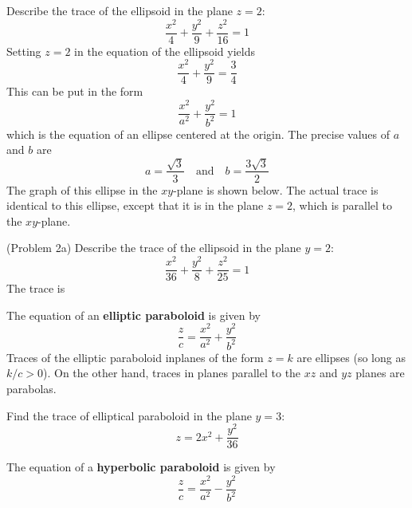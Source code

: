 \documentclass[handout]{ximera}
\begin{document}
\begin{example}[Example 2]
Describe the trace of the ellipsoid in the plane $z = 2$:
\[
\frac{x^2}{4} + \frac{y^2}{9}+ \frac{z^2}{16} = 1
\]
Setting $z = 2$ in the equation of the ellipsoid yields
\[
\frac{x^2}{4} + \frac{y^2}{9} = \frac34
\]
This can be put in the form
\[
\frac{x^2}{a^2} + \frac{y^2}{b^2} = 1
\]
which is the equation of an ellipse centered at the origin. The precise values of $a$ and $b$ are
\[
a = \frac{\sqrt 3}{3} \quad \text{and} \quad b = \frac{3\sqrt 3}{2}
\]
The graph of this ellipse in the $xy$-plane is shown below.
The actual trace is identical to this ellipse, except that it is in the plane $z = 2$, which is parallel to the $xy$-plane.

\begin{image}
\end{image}

\end{example}

\begin{problem}(Problem 2a)
Describe the trace of the ellipsoid in the plane $y = 2$:
\[
\frac{x^2}{36} + \frac{y^2}{8}+ \frac{z^2}{25} = 1
\]
The trace is 
\end{problem}

The equation of an \textbf{elliptic paraboloid} is given by 
\[
\frac{z}{c} = \frac{x^2}{a^2} + \frac{y^2}{b^2} 
\]
Traces of the elliptic paraboloid inplanes of the form $z = k$ are ellipses (so long as $k/c > 0$).
On the other hand, traces in planes parallel to the $xz$ and $yz$ planes are parabolas.

\begin{problem}[Problem 2b]
Find the trace of elliptical paraboloid in the plane $y = 3$:
\[
z = 2x^2 + \frac{y^2}{36}
\]
\end{problem}

The equation of a \textbf{hyperbolic paraboloid} is given by 
\[
\frac{z}{c} = \frac{x^2}{a^2} - \frac{y^2}{b^2} 
\]
\end{document}
